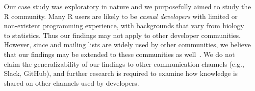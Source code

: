 \begin{description}[itemsep=3pt, topsep=2pt, leftmargin=1em, parsep=0pt]

\item[External validity:] Our case study was exploratory in nature and we purposefully aimed to study the R community. Many R users are likely to be \textit{casual developers} with limited or non-existent programming experience, with backgrounds that vary from biology to statistics. Thus our findings may not apply to other developer communities. However, since \SO and mailing lists are widely used by other communities, we believe that our findings may be extended to these communities as well~\cite{Squire2015a}. We do not claim the generalizability of our findings to other communication channels (e.g., Slack, GitHub), and further research is required to examine how knowledge is shared on other channels used by developers.

\end{description}

